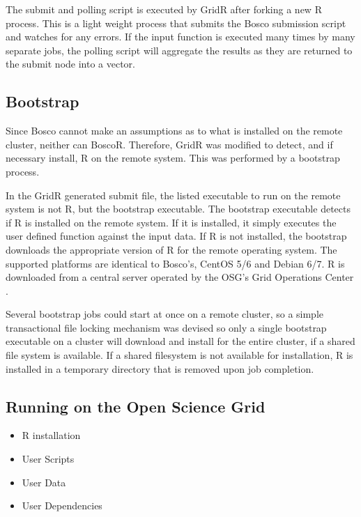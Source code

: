 \documentclass[conference]{IEEEtran}
\begin{document}
The submit and polling script is executed by GridR after forking a new R process.  This is a light weight process that submits the Bosco submission script and watches for any errors.  If the input function is executed many times by many separate jobs, the polling script will aggregate the results as they are returned to the submit node into a vector.  

\subsection{Bootstrap}
\label{sec:bootstrap}

Since Bosco cannot make an assumptions as to what is installed on the remote cluster, neither can BoscoR.  Therefore, GridR was modified to detect, and if necessary install, R on the remote system.  This was performed by a bootstrap process.

In the GridR generated submit file, the listed executable to run on the remote system is not R, but the bootstrap executable.  The bootstrap executable detects if R is installed on the remote system.  If it is installed, it simply executes the user defined function against the input data.  If R is not installed, the bootstrap downloads the appropriate version of R for the remote operating system.  The supported platforms are identical to Bosco's, CentOS 5/6 and Debian 6/7.  R is downloaded from a central server operated by the OSG's Grid Operations Center \cite{osgoperations}.  

Several bootstrap jobs could start at once on a remote cluster, so a simple transactional file locking mechanism was devised so only a single bootstrap executable on a cluster will download and install for the entire cluster, if a shared file system is available.  If a shared filesystem is not available for installation, R is installed in a temporary directory that is removed upon job completion.

\subsection{Running on the Open Science Grid}



\begin{itemize}
\item R installation
\item User Scripts
\item User Data
\item User Dependencies
\end{itemize}
\end{document}
